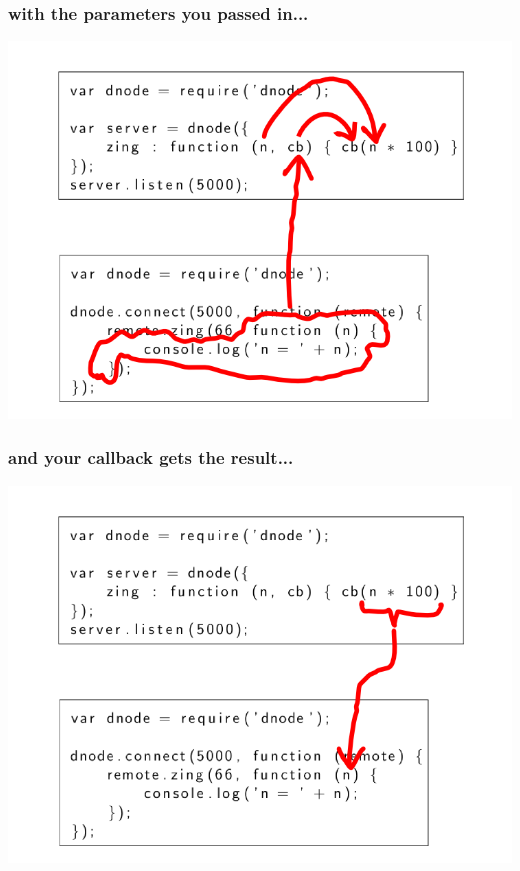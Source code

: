 \documentclass{beamer}
\begin{document}
\begin{frame}
    \frametitle{with the parameters you passed in...}
    \includegraphics[scale=0.6]{images/zing_flow_4.png}
\end{frame}

\begin{frame}
    \frametitle{and your callback gets the result...}
    \includegraphics[scale=0.6]{images/zing_flow_5.png}
\end{frame}
\end{document}
